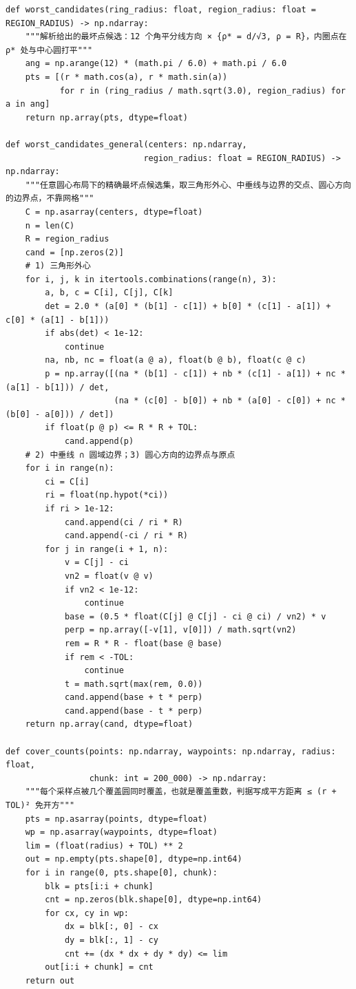 \documentclass[UTF8, zihao=5,AutoFakeBold=2]{ctexart}
\begin{document}
\begin{lstlisting}
def worst_candidates(ring_radius: float, region_radius: float = REGION_RADIUS) -> np.ndarray:
    """解析给出的最坏点候选：12 个角平分线方向 × {ρ* = d/√3, ρ = R}，内圈点在 ρ* 处与中心圆打平"""
    ang = np.arange(12) * (math.pi / 6.0) + math.pi / 6.0
    pts = [(r * math.cos(a), r * math.sin(a))
           for r in (ring_radius / math.sqrt(3.0), region_radius) for a in ang]
    return np.array(pts, dtype=float)

def worst_candidates_general(centers: np.ndarray,
                            region_radius: float = REGION_RADIUS) -> np.ndarray:
    """任意圆心布局下的精确最坏点候选集，取三角形外心、中垂线与边界的交点、圆心方向的边界点，不靠网格"""
    C = np.asarray(centers, dtype=float)
    n = len(C)
    R = region_radius
    cand = [np.zeros(2)]
    # 1) 三角形外心
    for i, j, k in itertools.combinations(range(n), 3):
        a, b, c = C[i], C[j], C[k]
        det = 2.0 * (a[0] * (b[1] - c[1]) + b[0] * (c[1] - a[1]) + c[0] * (a[1] - b[1]))
        if abs(det) < 1e-12:
            continue
        na, nb, nc = float(a @ a), float(b @ b), float(c @ c)
        p = np.array([(na * (b[1] - c[1]) + nb * (c[1] - a[1]) + nc * (a[1] - b[1])) / det,
                      (na * (c[0] - b[0]) + nb * (a[0] - c[0]) + nc * (b[0] - a[0])) / det])
        if float(p @ p) <= R * R + TOL:
            cand.append(p)
    # 2) 中垂线 ∩ 圆域边界；3) 圆心方向的边界点与原点
    for i in range(n):
        ci = C[i]
        ri = float(np.hypot(*ci))
        if ri > 1e-12:
            cand.append(ci / ri * R)
            cand.append(-ci / ri * R)
        for j in range(i + 1, n):
            v = C[j] - ci
            vn2 = float(v @ v)
            if vn2 < 1e-12:
                continue
            base = (0.5 * float(C[j] @ C[j] - ci @ ci) / vn2) * v
            perp = np.array([-v[1], v[0]]) / math.sqrt(vn2)
            rem = R * R - float(base @ base)
            if rem < -TOL:
                continue
            t = math.sqrt(max(rem, 0.0))
            cand.append(base + t * perp)
            cand.append(base - t * perp)
    return np.array(cand, dtype=float)

def cover_counts(points: np.ndarray, waypoints: np.ndarray, radius: float,
                 chunk: int = 200_000) -> np.ndarray:
    """每个采样点被几个覆盖圆同时覆盖，也就是覆盖重数，判据写成平方距离 ≤ (r + TOL)² 免开方"""
    pts = np.asarray(points, dtype=float)
    wp = np.asarray(waypoints, dtype=float)
    lim = (float(radius) + TOL) ** 2
    out = np.empty(pts.shape[0], dtype=np.int64)
    for i in range(0, pts.shape[0], chunk):
        blk = pts[i:i + chunk]
        cnt = np.zeros(blk.shape[0], dtype=np.int64)
        for cx, cy in wp:
            dx = blk[:, 0] - cx
            dy = blk[:, 1] - cy
            cnt += (dx * dx + dy * dy) <= lim
        out[i:i + chunk] = cnt
    return out


\end{lstlisting}
\end{document}
